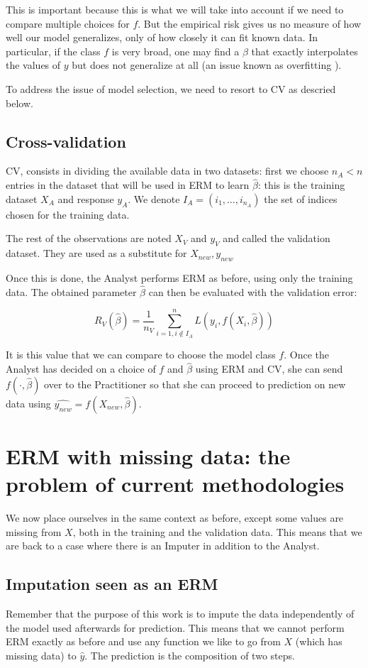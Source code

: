  This is important because this is what we will take into account if we need to compare multiple choices for $f$. But the empirical risk gives us no measure of how well our model generalizes, only of how closely it can fit known data. In particular, if the class $f$ is very broad, one may find a $\beta$ that exactly interpolates the values of $y$ but does not generalize at all (an issue known as overfitting \cite{hawkins2004overfitting}).

To address the issue of model selection, we need to resort to CV as descried below.

		\subsection{Cross-validation}
CV, consists in dividing the available data in two datasets: first we choose $n_A < n$ entries in the dataset that will be used in ERM to learn $\hat{\beta}$: this is the training dataset $X_A$ and response $y_A$. We denote $I_A = (i_1, \ldots, i_{n_A})$ the set of indices chosen for the training data.

The rest of the observations are noted $X_V$ and $y_V$ and called the validation dataset. They are used as a substitute for $X_{new},y_{new}$

Once this is done, the Analyst performs ERM as before, using only the training data. The obtained parameter $\hat{\beta}$ can then be evaluated with the validation error:

$$ R_{V}(\hat{\beta}) = \frac{1}{n_V} \sum\limits_{i=1, i \notin I_A}^n L(y_i, f(X_i, \hat{\beta}))$$

It is this value that we can compare to choose the model class $f$. Once the Analyst has decided on a choice of $f$ and $\hat{\beta}$ using ERM and CV, she can send $f(\cdot, \hat{\beta})$ over to the Practitioner so that she can proceed to prediction on new data using $\hat{y_{new}} = f(X_{new}, \hat{\beta})$.

	\section{ERM with missing data: the problem of current methodologies}
	\label{ERM.imp}
We now place ourselves in the same context as before, except some values are missing from $X$, both in the training and the validation data. This means that we are back to a case where there is an Imputer in addition to the Analyst.
		\subsection{Imputation seen as an ERM}
Remember that the purpose of this work is to impute the data independently of the model used afterwards for prediction. This means that we cannot perform ERM exactly as before and use any function we like to go from $X$ (which has missing data) to $\hat{y}$. The prediction is the composition of two steps.
